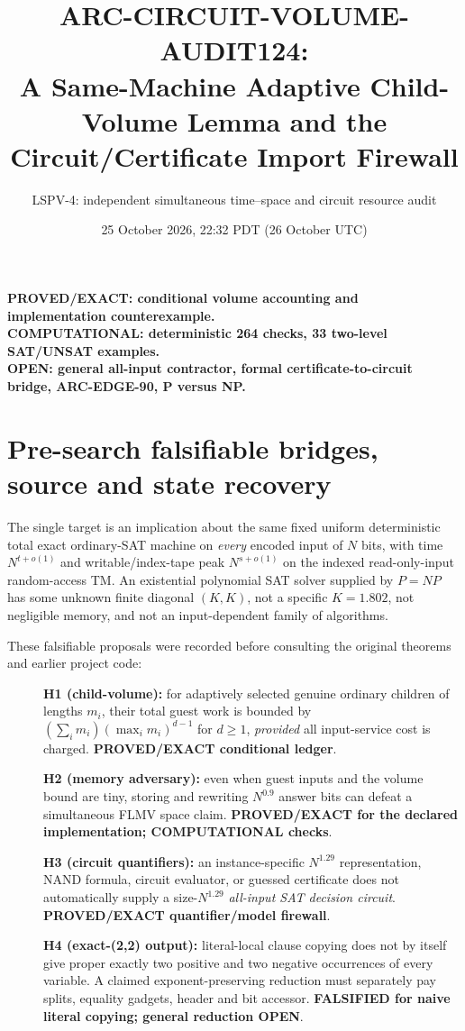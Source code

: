 \documentclass[11pt]{article}
\title{ARC-CIRCUIT-VOLUME-AUDIT124:\\
A Same-Machine Adaptive Child-Volume Lemma and the Circuit/Certificate Import Firewall}
\author{LSPV-4: independent simultaneous time--space and circuit resource audit}
\date{25 October 2026, 22:32 PDT (26 October UTC)}
\begin{document}
\maketitle
\begin{center}
\textbf{PROVED/EXACT: conditional volume accounting and implementation counterexample.}\\
\textbf{COMPUTATIONAL: deterministic 264 checks, 33 two-level SAT/UNSAT examples.}\\
\textbf{OPEN: general all-input contractor, formal certificate-to-circuit bridge, ARC-EDGE-90, P versus NP.}
\end{center}

\section{Pre-search falsifiable bridges, source and state recovery}
The single target is an implication about the same fixed uniform deterministic
total exact ordinary-SAT machine on \emph{every} encoded input of $N$ bits,
with time $N^{t+o(1)}$ and writable/index-tape peak
$N^{s+o(1)}$ on the indexed read-only-input random-access TM.
An existential polynomial SAT solver supplied by $P=NP$ has
some unknown finite diagonal $(K,K)$, not a specific $K=1.802$,
not negligible memory, and not an input-dependent family of algorithms.

These falsifiable proposals were recorded before consulting the original
theorems and earlier project code:
\begin{description}
\item[] \textbf{H1 (child-volume):} for adaptively selected genuine ordinary
children of lengths $m_i$, their total guest work is bounded by
$(\sum_i m_i)(\max_i m_i)^{d-1}$ for $d\ge1$, \emph{provided}
all input-service cost is charged. \textbf{PROVED/EXACT conditional ledger}.
\item[] \textbf{H2 (memory adversary):} even when guest inputs and the
volume bound are tiny, storing and rewriting $N^{0.9}$ answer bits
can defeat a simultaneous FLMV space claim.
\textbf{PROVED/EXACT for the declared implementation; COMPUTATIONAL checks}.
\item[] \textbf{H3 (circuit quantifiers):} an instance-specific $N^{1.29}$
representation, NAND formula, circuit evaluator, or guessed certificate
does not automatically supply a size-$N^{1.29}$ \emph{all-input SAT
decision circuit}. \textbf{PROVED/EXACT quantifier/model firewall}.
\item[] \textbf{H4 (exact-(2,2) output):} literal-local clause copying
does not by itself give proper exactly two positive and two negative
occurrences of every variable. A claimed exponent-preserving reduction
must separately pay splits, equality gadgets, header and bit accessor.
\textbf{FALSIFIED for naive literal copying; general reduction OPEN}.
\end{description}
\end{document}
